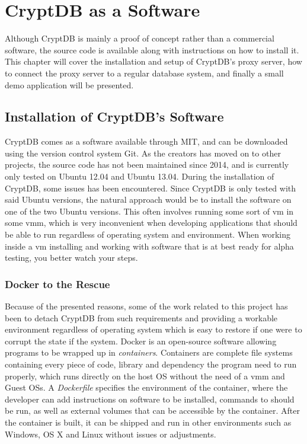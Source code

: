 \chapter{CryptDB as a Software}
\label{chp:software}

Although CryptDB is mainly a proof of concept rather than a commercial software, the source code is available along with instructions on how to install it. This chapter will cover the installation and setup of CryptDB's proxy server, how to connect the proxy server to a regular database system, and finally a small demo application will be presented.

\section{Installation of CryptDB's Software}

CryptDB comes as a software available through MIT, and can be downloaded using the version control system Git. As the creators has moved on to other projects, the source code has not been maintained since 2014, and is currently only tested on Ubuntu 12.04 and Ubuntu 13.04. During the installation of CryptDB, some issues has been encountered. Since CryptDB is only tested with said Ubuntu versions, the natural approach would be to install the software on one of the two Ubuntu versions. This often involves running some sort of \gls{vm} in some \gls{vmm}, which is very inconvenient when developing applications that should be able to run regardless of operating system and environment. When working inside a \gls{vm} installing and working with software that is at best ready for alpha testing, you better watch your steps. 

\subsection{Docker to the Rescue}


Because of the presented reasons, some of the work related to this project has been to detach CryptDB from such requirements and providing a workable environment regardless of operating system which is easy to restore if one were to corrupt the state if the system. Docker \cite{docker_homepage} is an open-source software allowing programs to be wrapped up in \emph{containers}. Containers are complete file systems containing every piece of code, 
library and dependency the program need to run properly, which runs directly on the host OS without the need of a \gls{vmm} and Guest OSs. A \emph{Dockerfile} specifies the environment of the container, where the developer can add instructions on software to be installed, commands to should be run, as well as external volumes that can be accessible by the container. After the container is built, it can be shipped and run in other environments such as Windows, OS X and Linux without issues or adjustments.

